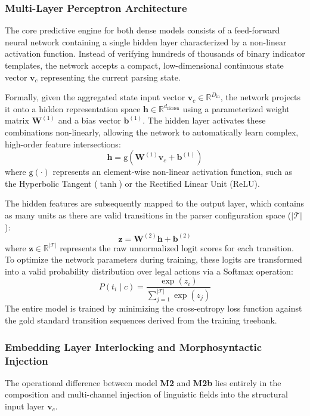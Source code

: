\documentclass[12pt,a4paper]{article}
\begin{document}
\subsubsection{Multi-Layer Perceptron Architecture}
The core predictive engine for both dense models consists of a feed-forward neural network containing a single hidden layer characterized by a non-linear activation function. Instead of verifying hundreds of thousands of binary indicator templates, the network accepts a compact, low-dimensional continuous state vector $\mathbf{v}_c$ representing the current parsing state.

Formally, given the aggregated state input vector $\mathbf{v}_c \in \mathbb{R}^{D_{\text{in}}}$, the network projects it onto a hidden representation space $\mathbf{h} \in \mathbb{R}^{d_{\text{hidden}}}$ using a parameterized weight matrix $\mathbf{W}^{(1)}$ and a bias vector $\mathbf{b}^{(1)}$. The hidden layer activates these combinations non-linearly, allowing the network to automatically learn complex, high-order feature intersections:
\begin{equation}
    \mathbf{h} = \text{g}\left( \mathbf{W}^{(1)} \mathbf{v}_c + \mathbf{b}^{(1)} \right)
\end{equation}
where $\text{g}(\cdot)$ represents an element-wise non-linear activation function, such as the Hyperbolic Tangent ($\tanh$) or the Rectified Linear Unit ($\text{ReLU}$). 

The hidden features are subsequently mapped to the output layer, which contains as many units as there are valid transitions in the parser configuration space ($|\mathcal{T}|$):
\begin{equation}
    \mathbf{z} = \mathbf{W}^{(2)} \mathbf{h} + \mathbf{b}^{(2)}
\end{equation}
where $\mathbf{z} \in \mathbb{R}^{|\mathcal{T}|}$ represents the raw unnormalized logit scores for each transition. To optimize the network parameters during training, these logits are transformed into a valid probability distribution over legal actions via a Softmax operation:
\begin{equation}
    P(t_i \mid c) = \frac{\exp(z_i)}{\sum_{j=1}^{|\mathcal{T}|} \exp(z_j)}
\end{equation}
The entire model is trained by minimizing the cross-entropy loss function against the gold standard transition sequences derived from the training treebank.

\subsubsection{Embedding Layer Interlocking and Morphosyntactic Injection}
The operational difference between model \textbf{M2} and \textbf{M2b} lies entirely in the composition and multi-channel injection of linguistic fields into the structural input layer $\mathbf{v}_c$.
\end{document}
